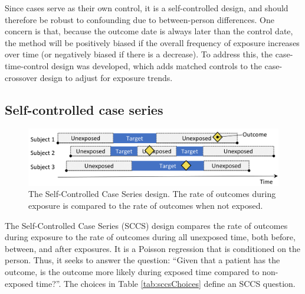 \documentclass[11pt]{book}
\begin{document}
Since cases serve as their own control, it is a self-controlled design,
and should therefore be robust to confounding due to between-person
differences. One concern is that, because the outcome date is always
later than the control date, the method will be positively biased if the
overall frequency of exposure increases over time (or negatively biased
if there is a decrease). To address this, the case-time-control design
\citep{suissa_1995} was developed, which adds matched controls to the
case-crossover design to adjust for exposure trends.

\subsection{Self-controlled case
series}\label{self-controlled-case-series}

\begin{figure}

{\centering \includegraphics[width=0.9\linewidth]{images/PopulationLevelEstimation/selfControlledCaseSeries} 

}

\caption{The Self-Controlled Case Series design. The rate of outcomes during exposure is compared to the rate of outcomes when not exposed.}\label{fig:selfControlledCaseSeries}
\end{figure}

The Self-Controlled Case Series (SCCS) design
\citep[whitaker\_2006]{farrington_1995} compares the rate of outcomes
during exposure to the rate of outcomes during all unexposed time, both
before, between, and after exposures. It is a Poisson regression that is
conditioned on the person. Thus, it seeks to answer the question:
``Given that a patient has the outcome, is the outcome more likely
during exposed time compared to non-exposed time?''. The choices in
Table \ref{tab:sccsChoices} define an SCCS question.
\end{document}
